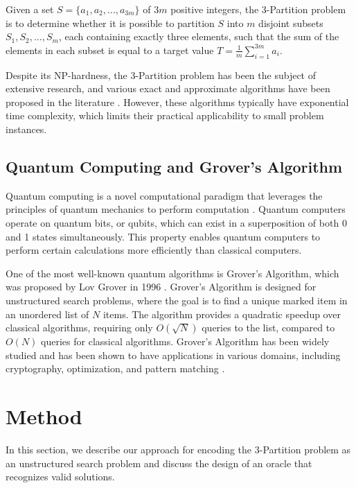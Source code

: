 \begin{definition}
Given a set $S = \{a_1, a_2, \ldots, a_{3m}\}$ of $3m$ positive integers, the 3-Partition problem is to determine whether it is possible to partition $S$ into $m$ disjoint subsets $S_1, S_2, \ldots, S_m$, each containing exactly three elements, such that the sum of the elements in each subset is equal to a target value $T = \frac{1}{m}\sum_{i=1}^{3m} a_i$.
\end{definition}

Despite its NP-hardness, the 3-Partition problem has been the subject of extensive research, and various exact and approximate algorithms have been proposed in the literature \cite{karmarkar1982new, martello1990algorithms, schroeppel1972las}. However, these algorithms typically have exponential time complexity, which limits their practical applicability to small problem instances.

\subsection{Quantum Computing and Grover's Algorithm}

Quantum computing is a novel computational paradigm that leverages the principles of quantum mechanics to perform computation \cite{nielsen2000quantum}. Quantum computers operate on quantum bits, or qubits, which can exist in a superposition of both 0 and 1 states simultaneously. This property enables quantum computers to perform certain calculations more efficiently than classical computers.

One of the most well-known quantum algorithms is Grover's Algorithm, which was proposed by Lov Grover in 1996 \cite{grover1996fast}. Grover's Algorithm is designed for unstructured search problems, where the goal is to find a unique marked item in an unordered list of $N$ items. The algorithm provides a quadratic speedup over classical algorithms, requiring only $O(\sqrt{N})$ queries to the list, compared to $O(N)$ queries for classical algorithms. Grover's Algorithm has been widely studied and has been shown to have applications in various domains, including cryptography, optimization, and pattern matching \cite{brassard1998quantum,childs2000quantum,durr1996quantum}.

\section{Method}
\label{sec:method}

In this section, we describe our approach for encoding the 3-Partition problem as an unstructured search problem and discuss the design of an oracle that recognizes valid solutions.

